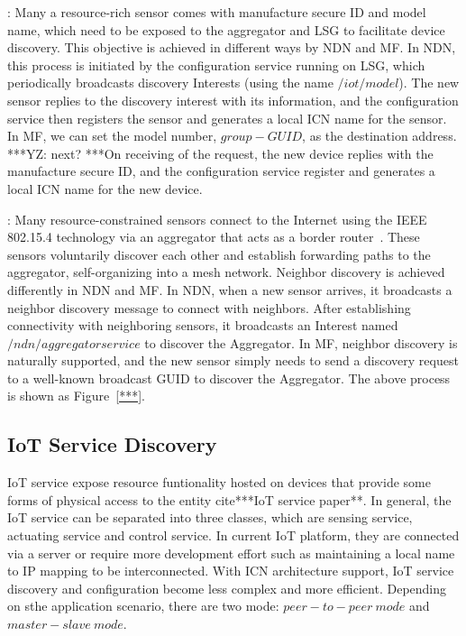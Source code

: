 \vspace{1mm}: Many a resource-rich sensor comes with manufacture secure ID and model name, which need to be exposed to the aggregator and LSG to facilitate device discovery. This objective is achieved in different ways by NDN and MF.  In NDN, this process is initiated by the configuration service running on LSG, which periodically broadcasts discovery Interests (using the name $/iot/model$). The new sensor replies to the discovery interest with its information, and the configuration service then registers the sensor and generates a local ICN name for the sensor. In MF, we can set the model number, $group-GUID$, as the destination address. ***YZ: next? ***On receiving of the request, the new device replies with the manufacture secure ID, and the configuration service register and generates a local ICN name for the new device.


\vspace{1mm}: Many resource-constrained sensors connect to the Internet using the IEEE 802.15.4 technology via an aggregator that acts as a border router~\cite{*cite Zigbee ipj*}. These sensors voluntarily discover each other and establish forwarding paths to the aggregator, self-organizing into a mesh network. Neighbor discovery is achieved differently in NDN and MF. In NDN, when a new sensor arrives, it broadcasts a neighbor discovery message to connect with neighbors. After establishing connectivity with neighboring sensors, it broadcasts an Interest named $/ndn/aggregatorservice$ to discover the Aggregator. In MF, neighbor discovery is naturally supported, and the new sensor simply needs to send a discovery request to a well-known broadcast GUID to discover the Aggregator. %
The above process is shown as Figure~\ref{***}.




\subsection{IoT Service Discovery}

IoT service expose resource funtionality hosted on devices that provide some forms of physical access to the entity cite{***IoT service paper**}. In general, the IoT service can be separated into three classes, which are sensing service, actuating service and control service. In current IoT platform, they are connected via a server or require more development effort such as maintaining a local name to IP mapping to be interconnected. With ICN architecture support, IoT service discovery and configuration become less complex and more efficient. Depending on sthe application scenario, there are two mode: $peer-to-peer\ mode$ and $master-slave\ mode$.


